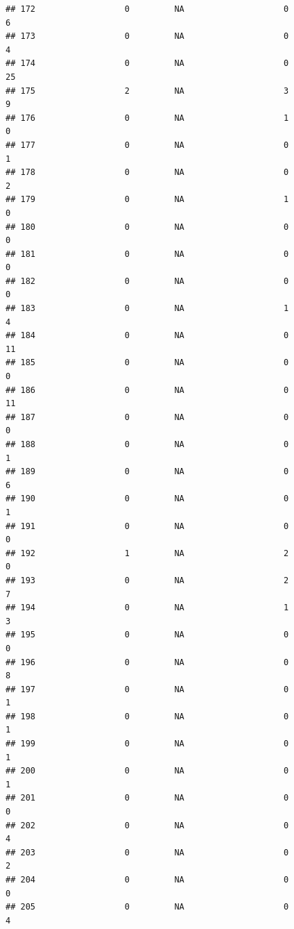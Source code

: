 \documentclass[
]{article}
\begin{document}
\begin{verbatim}
## 172                  0         NA                    0                  6
## 173                  0         NA                    0                  4
## 174                  0         NA                    0                 25
## 175                  2         NA                    3                  9
## 176                  0         NA                    1                  0
## 177                  0         NA                    0                  1
## 178                  0         NA                    0                  2
## 179                  0         NA                    1                  0
## 180                  0         NA                    0                  0
## 181                  0         NA                    0                  0
## 182                  0         NA                    0                  0
## 183                  0         NA                    1                  4
## 184                  0         NA                    0                 11
## 185                  0         NA                    0                  0
## 186                  0         NA                    0                 11
## 187                  0         NA                    0                  0
## 188                  0         NA                    0                  1
## 189                  0         NA                    0                  6
## 190                  0         NA                    0                  1
## 191                  0         NA                    0                  0
## 192                  1         NA                    2                  0
## 193                  0         NA                    2                  7
## 194                  0         NA                    1                  3
## 195                  0         NA                    0                  0
## 196                  0         NA                    0                  8
## 197                  0         NA                    0                  1
## 198                  0         NA                    0                  1
## 199                  0         NA                    0                  1
## 200                  0         NA                    0                  1
## 201                  0         NA                    0                  0
## 202                  0         NA                    0                  4
## 203                  0         NA                    0                  2
## 204                  0         NA                    0                  0
## 205                  0         NA                    0                  4

\end{verbatim}
\end{document}
